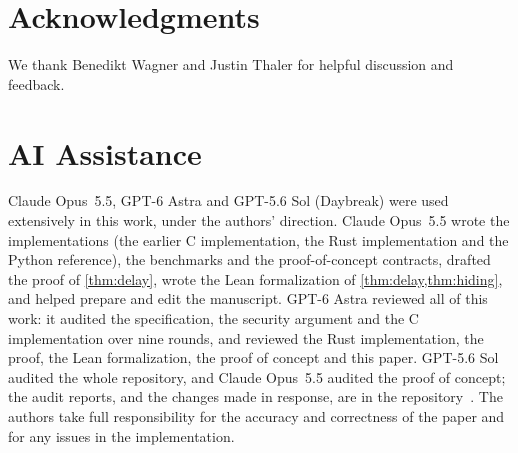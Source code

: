 \section*{Acknowledgments}

We thank Benedikt Wagner and Justin Thaler for helpful discussion and feedback.

\section*{AI Assistance}

Claude Opus~5.5, GPT-6 Astra and GPT-5.6 Sol (Daybreak) were used extensively in this work, under the authors' direction. Claude Opus~5.5 wrote the implementations (the earlier C implementation, the Rust implementation and the Python reference), the benchmarks and the proof-of-concept contracts, drafted the proof of \cref{thm:delay}, wrote the Lean formalization of \cref{thm:delay,thm:hiding}, and helped prepare and edit the manuscript. GPT-6 Astra reviewed all of this work: it audited the specification, the security argument and the C implementation over nine rounds, and reviewed the Rust implementation, the proof, the Lean formalization, the proof of concept and this paper. GPT-5.6 Sol audited the whole repository, and Claude Opus~5.5 audited the proof of concept; the audit reports, and the changes made in response, are in the repository~\cite{leanSealRepo}. The authors take full responsibility for the accuracy and correctness of the paper and for any issues in the implementation.
